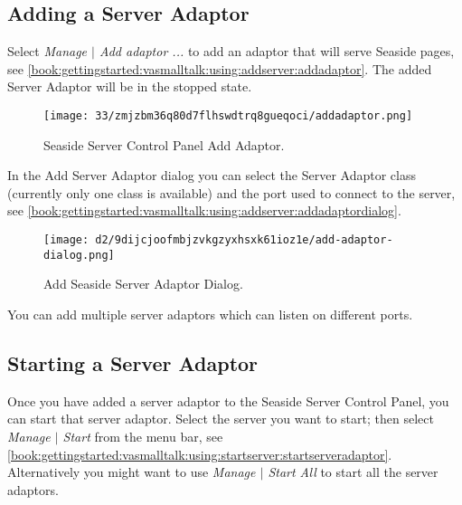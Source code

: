 \documentclass[a4paper,10pt,twoside]{book}
\begin{document}
\subsection{Adding a Server Adaptor}
\label{book:gettingstarted:vasmalltalk:using:addserver}

Select \textit{Manage $|$ Add adaptor ...} to add an adaptor that will serve Seaside pages, see \autoref{book:gettingstarted:vasmalltalk:using:addserver:addadaptor}. The added Server Adaptor will be in the stopped state.
  
\begin{figure}[h!tbp]
	\begin{center}
		\texttt{[image: 33/zmjzbm36q80d7flhswdtrq8gueqoci/addadaptor.png]}
		\caption{Seaside Server Control Panel Add Adaptor.\label{book:gettingstarted:vasmalltalk:using:addserver:addadaptor}}
	\end{center}
\end{figure}


In the Add Server Adaptor dialog you can select the Server Adaptor class (currently only one class is available) and the port used to connect to the server, see \autoref{book:gettingstarted:vasmalltalk:using:addserver:addadaptordialog}.

\begin{figure}[h!tbp]
	\begin{center}
		\texttt{[image: d2/9dijcjoofmbjzvkgzyxhsxk61ioz1e/add-adaptor-dialog.png]}
		\caption{Add Seaside Server Adaptor Dialog.\label{book:gettingstarted:vasmalltalk:using:addserver:addadaptordialog}}
	\end{center}
\end{figure}


You can add multiple server adaptors which can listen on different ports.

\subsection{Starting a Server Adaptor}
\label{book:gettingstarted:vasmalltalk:using:startserver}

Once you have added a server adaptor to the Seaside Server Control Panel, you can start that server adaptor.  Select the server you want to start; then select \textit{Manage $|$ Start} from the menu bar, see \autoref{book:gettingstarted:vasmalltalk:using:startserver:startserveradaptor}. Alternatively you might want to use \textit{Manage $|$ Start All} to start all the server adaptors.
\end{document}
